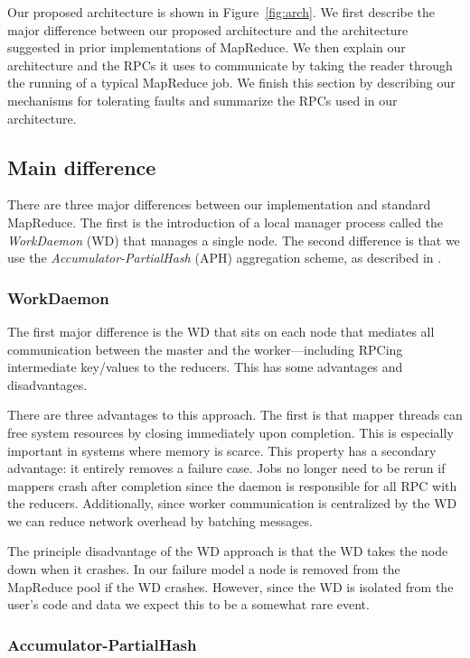 \documentclass[10pt,letter,final,article,twocolumn]{article} %
\begin{document}
Our proposed architecture is shown in Figure~\ref{fig:arch}. We first describe the major difference between our proposed architecture and the architecture suggested in prior implementations of MapReduce. We then explain our architecture and the RPCs it uses to communicate by taking the reader through the running of a typical MapReduce job. We finish this section by describing our mechanisms for tolerating faults and summarize the RPCs used in our architecture.

\subsection{Main difference}

There are three major differences between our implementation and standard MapReduce. The first is the introduction of a local manager process called the \emph{WorkDaemon} (WD) that manages a single node. The second difference is that we use the \emph{Accumulator-PartialHash} (APH) aggregation scheme, as described in \citet{yu2009distributed}.

\subsubsection{WorkDaemon}

The first major difference is the WD that sits on each node that mediates all communication between the master and the worker---including RPCing intermediate key/values to the reducers. This has some advantages and disadvantages.

There are three advantages to this approach. The first is that mapper threads can free system resources by closing immediately upon completion. This is especially important in systems where memory is scarce. This property has a secondary advantage: it entirely removes a failure case. Jobs no longer need to be rerun if mappers crash after completion since the daemon is responsible for all RPC with the reducers. Additionally, since worker communication is centralized by the WD we can reduce network overhead by batching messages.

The principle disadvantage of the WD approach is that the WD takes the node down when it crashes. In our failure model a node is removed from the MapReduce pool if the WD crashes. However, since the WD is isolated from the user's code and data we expect this to be a somewhat rare event.

\subsubsection{Accumulator-PartialHash}
\end{document}
